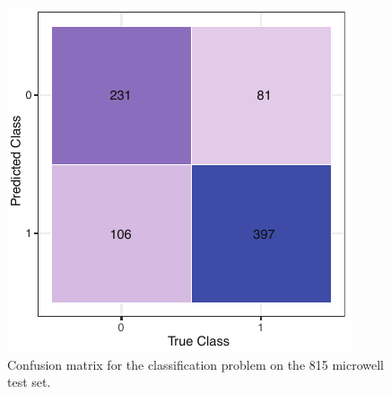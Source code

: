 \documentclass[10pt,twocolumn,letterpaper]{article}
\begin{document}
 \begin{figure}[b!]
\begin{center}
 \includegraphics[width=0.9\linewidth]{figures/classification/test_set_confusion_matrix.pdf}
\end{center}
   \caption{Confusion matrix for the classification problem on the 815 microwell test set.}
\label{test_set_confusion_matrix}
\end{figure}



\end{document}
